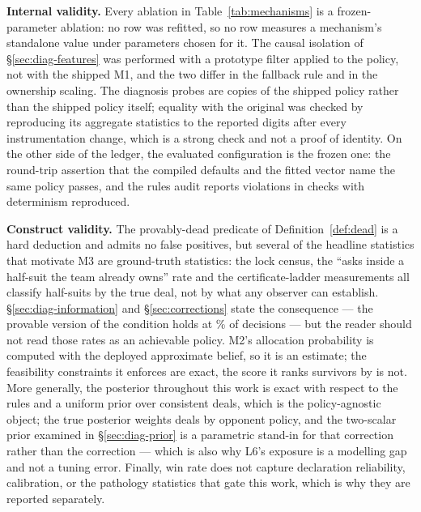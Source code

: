\textbf{Internal validity.} Every ablation in Table~\ref{tab:mechanisms} is a
frozen-parameter ablation: no row was refitted, so no row measures a mechanism's
standalone value under parameters chosen for it. The causal isolation of
\S\ref{sec:diag-features} was performed with a prototype filter applied to the
\vfour{} policy, not with the shipped M1, and the two differ in the fallback rule
and in the ownership scaling. The diagnosis probes are copies of the shipped
policy rather than the shipped policy itself; equality with the original was
checked by reproducing its aggregate statistics to the reported digits after
every instrumentation change, which is a strong check and not a proof of
identity. On the other side of the ledger, the evaluated configuration is the
frozen one: the round-trip assertion that the compiled defaults and the fitted
vector name the same policy passes, and the rules audit reports
\numVerifyViolations{} violations in \numVerifyChecks{} checks with determinism
reproduced.

\textbf{Construct validity.} The provably-dead predicate of
Definition~\ref{def:dead} is a hard deduction and admits no false positives, but
several of the headline statistics that motivate M3 are ground-truth statistics:
the lock census, the ``asks inside a half-suit the team already owns'' rate and
the certificate-ladder measurements all classify half-suits by the true deal, not
by what any observer can establish. \S\ref{sec:diag-information} and
\S\ref{sec:corrections} state the consequence --- the provable version of the
condition holds at \numProvableOwn\% of decisions --- but the reader should not
read those rates as an achievable policy. M2's allocation probability is computed
with the deployed approximate belief, so it is an estimate; the feasibility
constraints it enforces are exact, the score it ranks survivors by is not.
More generally, the posterior throughout this work is exact with respect to the
rules and a uniform prior over consistent deals, which is the policy-agnostic
object; the true posterior weights deals by opponent policy, and the two-scalar
prior examined in \S\ref{sec:diag-prior} is a parametric stand-in for that
correction rather than the correction --- which is also why L6's exposure is a
modelling gap and not a tuning error. Finally, win rate does not capture
declaration reliability, calibration, or the pathology statistics that gate this
work, which is why they are reported separately.

